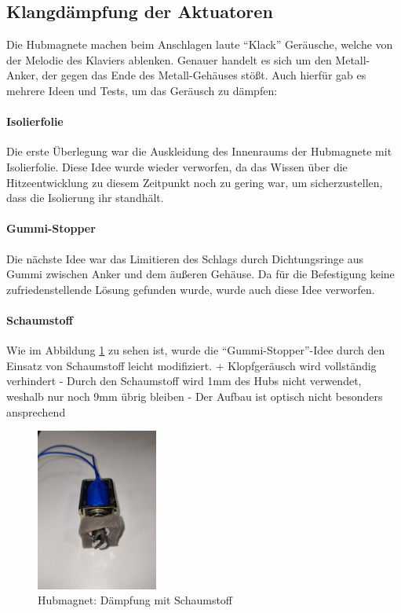 \subsection{Klangdämpfung der Aktuatoren}

Die Hubmagnete machen beim Anschlagen laute \enquote{Klack} Geräusche, welche von der Melodie des Klaviers ablenken.
Genauer handelt es sich um den Metall-Anker, der gegen das Ende des Metall-Gehäuses stößt.
Auch hierfür gab es mehrere Ideen und Tests, um das Geräusch zu dämpfen:

\paragraph{Isolierfolie}

Die erste Überlegung war die Auskleidung des Innenraums der Hubmagnete mit Isolierfolie.
Diese Idee wurde wieder verworfen, da das Wissen über die Hitzeentwicklung zu diesem Zeitpunkt noch zu gering war, um sicherzustellen, dass die Isolierung ihr standhält.

\paragraph{Gummi-Stopper}

Die nächste Idee war das Limitieren des Schlags durch Dichtungsringe aus Gummi
zwischen Anker und dem äußeren Gehäuse.
Da für die Befestigung keine zufriedenstellende Lösung gefunden wurde, wurde auch diese Idee verworfen.

\paragraph{Schaumstoff}

Wie im Abbildung \ref{fig:schaumstoff} zu sehen ist, wurde die \enquote{Gummi-Stopper}-Idee durch den Einsatz von Schaumstoff leicht modifiziert. \newline
+ Klopfgeräusch wird vollständig verhindert \newline
- Durch den Schaumstoff wird 1mm des Hubs nicht verwendet, weshalb nur noch 9mm übrig bleiben \newline
- Der Aufbau ist optisch nicht besonders ansprechend

\begin{figure}[htbp]
    \centering
    \includegraphics [width=4cm] {img/Daempfung_Schaumstoff}
    \caption{Hubmagnet: Dämpfung mit Schaumstoff}
    \label{fig:schaumstoff}
\end{figure}


